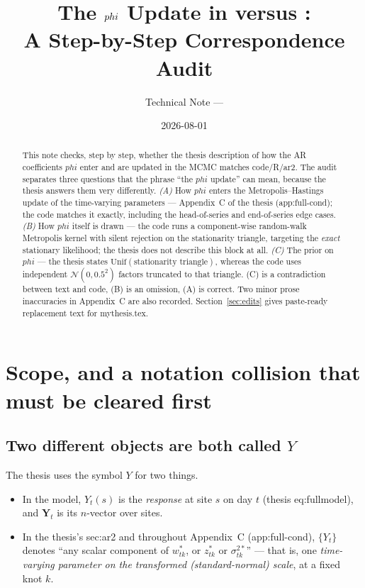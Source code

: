 \documentclass[11pt]{article}
\title{The $\bphi$ Update in \code{mythesis.tex} versus \code{code/R/ar2}:\\
       A Step-by-Step Correspondence Audit}
\author{Technical Note --- \code{thesis\_phi\_update\_audit}}
\date{2026-08-01}
\newcommand{\bphi}{\boldsymbol{\varphi}}
\newcommand{\bY}{\mathbf{Y}}
\newcommand{\Norm}{\mathcal{N}}
\newcommand{\Unif}{\mathrm{Unif}}
\DeclareRobustCommand{\code}[1]{\texttt{#1}}
\newcommand{\sref}[1]{Section~\ref{#1}}
\def\bphi{phi}%
\def\boldsymbol#1{#1}%
\def\bm#1{#1}%
\def\code#1{#1}%
\theoremstyle{plain}
\theoremstyle{definition}
\theoremstyle{remark}
\begin{document}
\maketitle

\begin{abstract}
\noindent
This note checks, step by step, whether the thesis description of how the AR
coefficients $\bphi$ enter and are updated in the MCMC matches
\code{code/R/ar2}. The audit separates three questions that the phrase ``the
$\bphi$ update'' can mean, because the thesis answers them very differently.
\emph{(A)} How $\bphi$ enters the Metropolis--Hastings update of the
time-varying parameters --- Appendix~C of the thesis
(\code{app:full-cond}); the code matches it exactly, including the
head-of-series and end-of-series edge cases. \emph{(B)} How $\bphi$ itself is
drawn --- the code runs a component-wise random-walk Metropolis kernel with
silent rejection on the stationarity triangle, targeting the \emph{exact}
stationary likelihood; the thesis does not describe this block at all.
\emph{(C)} The prior on $\bphi$ --- the thesis states
$\Unif(\text{stationarity triangle})$, whereas the code uses independent
$\Norm(0, 0.5^2)$ factors truncated to that triangle. (C) is a contradiction
between text and code, (B) is an omission, (A) is correct. Two minor prose
inaccuracies in Appendix~C are also recorded. \sref{sec:edits} gives
paste-ready replacement text for \code{mythesis.tex}.
\end{abstract}

\tableofcontents

\section{Scope, and a notation collision that must be cleared first}
\label{sec:scope}

\subsection{Two different objects are both called $Y$}

The thesis uses the symbol $Y$ for two things.

\begin{itemize}[nosep]
  \item In the model, $Y_t(\bm{s})$ is the \emph{response} at site $\bm{s}$ on
        day $t$ (thesis \code{eq:fullmodel}), and $\bY_t$ is its
        $n$-vector over sites.
  \item In the thesis's \code{sec:ar2} and throughout Appendix~C
        (\code{app:full-cond}), $\{Y_t\}$ denotes ``any scalar component of
        $\bm{w}^{*}_{tk}$, or $z^{*}_{tk}$ or $\sigma^{2*}_{tk}$'' --- that
        is, one \emph{time-varying parameter on the transformed
        (standard-normal) scale}, at a fixed knot $k$.
\end{itemize}
\end{document}
